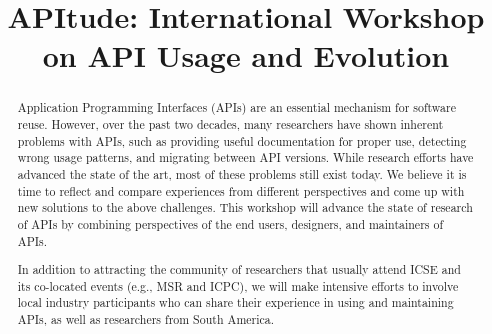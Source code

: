 \documentclass[10pt, conference]{IEEEtran}
\begin{document}
\title{APItude: International Workshop on API Usage and Evolution}


\newcommand\tud[0]{\textsuperscript{\normalfont \textdagger}}
\newcommand\iowa[0]{\textsuperscript{\normalfont \textparagraph}}
\newcommand\utd[0]{\textsuperscript{\normalfont \ddag}}
\newcommand\lanu[0]{\textsuperscript{\normalfont \textsection}}
\newcommand\ualberta[0]{\textsuperscript{\normalfont \textasteriskcentered}}

\author{
\and
{}
\and
{}
\and
{}
}


\maketitle


\begin{abstract}
Application Programming Interfaces (APIs) are an essential mechanism for software reuse. However, over the past two decades, many researchers have shown inherent problems with APIs, such as providing useful documentation for proper use, detecting wrong usage patterns, and migrating between API versions. While research efforts have advanced the state of the art, most of these problems still exist today. We believe it is time to reflect and compare experiences from different perspectives and come up with new solutions to the above challenges. This workshop will advance the state of research of APIs by combining perspectives of the end users, designers, and maintainers of APIs.

In addition to attracting the community of researchers that usually attend ICSE and its co-located events (e.g., MSR and ICPC), we will make intensive efforts to involve local industry participants who can share their experience in using and maintaining APIs, as well as researchers from South America.
\end{abstract}
\end{document}
